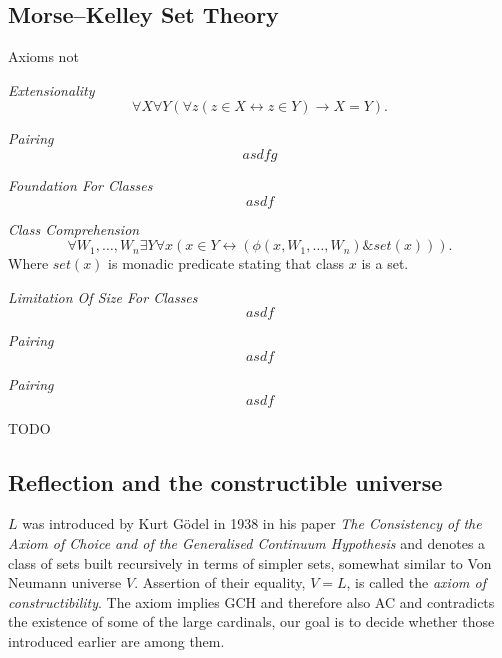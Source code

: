 \documentclass[12pt,a4paper]{article}
\renewcommand{\iff}{\leftrightarrow}
\newcommand{\then}{\rightarrow}
\newcommand{\bce}{\begin{compactenum}}
\newcommand{\ece}{\end{compactenum}}
\begin{document}
\newpage
\subsection{Morse–Kelley Set Theory}
Axioms not 
\bce[(i)]
\item \emph{Extensionality}
\begin{equation}
\forall X \forall Y (\forall z ( z \in X \iff z \in Y) \then X = Y).
\end{equation}
\item \emph{Pairing}
\begin{equation}
asdfg
\end{equation}
\item \emph{Foundation For Classes}
\begin{equation}
asdf
\end{equation}
\item \emph{Class Comprehension}
\begin{equation}
\forall W_1, \ldots, W_n \exists Y \forall x (x \in Y \iff (\phi (x, W_1, \ldots, W_n) \& set(x))).
\end{equation}
Where $set(x)$ is monadic predicate stating that class $x$ is a set.
\item \emph{Limitation Of Size For Classes}
\begin{equation}
asdf
\end{equation}
\item \emph{Pairing}
\begin{equation}
asdf
\end{equation}
\item \emph{Pairing}
\begin{equation}
asdf
\end{equation}
\ece
TODO


\newpage
\subsection{Reflection and the constructible universe}
$L$ was introduced by Kurt Gödel in 1938 in his paper \emph{The Consistency of the Axiom of Choice and of the Generalised Continuum Hypothesis} and denotes a class of sets built recursively in terms of simpler sets, somewhat similar to Von Neumann universe $V$. Assertion of their equality, $V=L$, is called the \emph{axiom of constructibility}. The axiom implies GCH and therefore also AC and contradicts the existence of some of the large cardinals, our goal is to decide whether those introduced earlier are among them.
\end{document}

